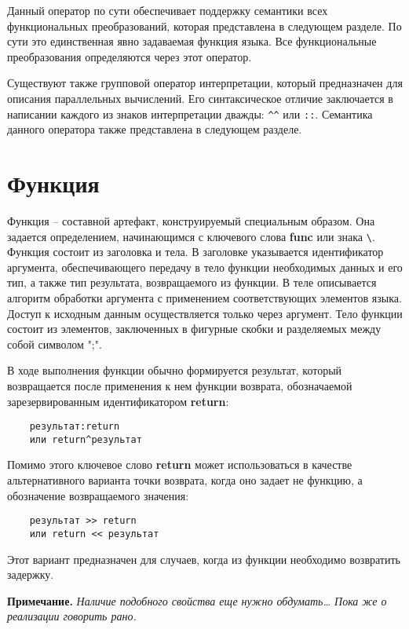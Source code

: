 {Данный оператор по сути обеспечивает поддержку семантики всех функциональных преобразований, которая представлена в следующем разделе. По сути это единственная явно задаваемая функция языка. Все функциональные преобразования определяются через этот оператор.

Существуют также групповой оператор интерпретации, который предназначен для описания параллельных вычислений. Его синтаксическое отличие заключается в написании каждого из знаков интерпретации дважды: \verb|^^| или \verb|::|. Семантика данного оператора также представлена в следующем разделе.

\section{Функция}

Функция – составной артефакт, конструируемый специальным образом. Она задается определением, начинающимся с ключевого слова \textbf{func} или знака \verb|\|. Функция состоит из заголовка и тела. В заголовке указывается идентификатор аргумента, обеспечивающего передачу в тело функции необходимых данных и его тип, а также тип результата, возвращаемого из функции. В теле описывается алгоритм обработки аргумента с применением соответствующих элементов языка. Доступ к исходным данным осуществляется только через аргумент. Тело функции состоит из элементов, заключенных в фигурные скобки и разделяемых между собой символом ";".

В ходе выполнения функции обычно формируется результат, который возвращается после применения к нем функции возврата, обозначаемой зарезервированным идентификатором \textbf{return}:

\begin{verbatim}
    результат:return
    или return^результат
\end{verbatim}

Помимо этого ключевое слово \textbf{return} может использоваться в качестве альтернативного варианта точки возврата, когда оно задает не функцию, а обозначение возвращаемого значения:

\begin{verbatim}
    результат >> return
    или return << результат
\end{verbatim}

Этот вариант предназначен для случаев, когда из функции необходимо возвратить задержку.

\textbf{Примечание.}
\textit{Наличие подобного свойства еще нужно обдумать… Пока же о реализации говорить рано.}

}
